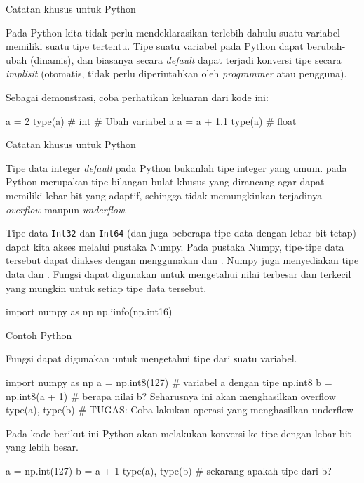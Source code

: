 \begin{frame}[fragile]{Catatan khusus untuk Python}

Pada Python kita tidak perlu mendeklarasikan terlebih dahulu suatu variabel memiliki
suatu tipe tertentu. Tipe suatu variabel pada Python dapat berubah-ubah (dinamis), dan
biasanya secara \textit{default} dapat terjadi konversi tipe secara \textit{implisit} (otomatis, tidak
perlu diperintahkan oleh \textit{programmer} atau pengguna).

Sebagai demonstrasi, coba perhatikan keluaran dari kode ini:
\begin{pythoncode}
a = 2
type(a) # int
# Ubah variabel a
a = a + 1.1
type(a) # float
\end{pythoncode}

\end{frame}



\begin{frame}[fragile]{Catatan khusus untuk Python}

Tipe data integer \textit{default} pada Python bukanlah tipe integer yang umum.
 pada Python merupakan tipe bilangan bulat khusus yang dirancang agar dapat
memiliki lebar bit yang adaptif, sehingga tidak memungkinkan terjadinya
\textit{overflow} maupun \textit{underflow}.

Tipe data \texttt{Int32} dan \texttt{Int64} (dan juga beberapa tipe data dengan lebar bit
tetap) dapat kita akses melalui pustaka Numpy. Pada pustaka Numpy, tipe-tipe data
tersebut dapat diakses dengan menggunakan  dan .
Numpy juga menyediakan tipe data  dan .
Fungsi  dapat digunakan untuk mengetahui nilai terbesar
dan terkecil yang mungkin untuk setiap tipe data tersebut.

\begin{pythoncode}
import numpy as np
np.iinfo(np.int16)
\end{pythoncode}

\end{frame}




\begin{frame}[fragile]{Contoh Python}

Fungsi  dapat digunakan untuk mengetahui tipe dari suatu
variabel.

\begin{pythoncode}
import numpy as np
a = np.int8(127) # variabel a dengan tipe np.int8
b = np.int8(a + 1) # berapa nilai b? Seharusnya ini akan menghasilkan overflow
type(a), type(b)
# TUGAS: Coba lakukan operasi yang menghasilkan underflow
\end{pythoncode}

Pada kode berikut ini Python akan melakukan konversi ke tipe dengan lebar bit
yang lebih besar.
\begin{pythoncode}
a = np.int(127)
b = a + 1
type(a), type(b) # sekarang apakah tipe dari b?
\end{pythoncode}

\end{frame}


